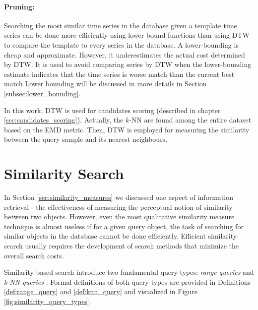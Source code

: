 \paragraph{Pruning:} Searching the most similar time series in the database given a template time series can be done more efficiently using lower bound functions than using DTW to compare the template to every series in the database. 
A lower-bounding is cheap and approximate. 
However, it underestimates the actual cost determined by DTW. 
It is used to avoid comparing series by DTW when the lower-bounding estimate indicates that the time series is worse match than the current best match \cite{rath2003word} 
Lower bounding will be discussed in more details in Section \ref{subsec:lower_bounding}.

\iftoggle{edit-mode}{\hspace{0pt}\marginpar{How DTW is used in this work?}}{}
In this work, DTW is used for candidates scoring (described in chapter \ref{sec:candidates_scoring}). 
Actually, the $k$-NN are found among the entire dataset based on the EMD metric. 
Then, DTW is employed for measuring the similarity between the query sample and its nearest neighbours.


\newpage{}

\section{Similarity Search}
\label{sec:similarity_search}
 
\iftoggle{edit-mode}{\hspace{0pt}\marginpar{Introduction}}{}
In Section \ref{sec:similarity_measures} we discussed one aspect of information retrieval - the effectiveness of measuring the perceptual notion of similarity between two objects.
However, even the most qualitative similarity measure technique is almost useless if for a given query object, the task of searching for similar objects in the database cannot be done efficiently.
Efficient similarity search usually requires the development of search methods that minimize the overall search costs.

\iftoggle{edit-mode}{\hspace{0pt}\marginpar{Similarity search query types}}{}
Similarity based search introduce two fundamental query types: \emph{range queries} and \emph{k-NN queries} \cite{hetland2009basic}. 
Formal definitions of both query types are provided in Definitions \ref{def:range_query} and \ref{def:knn_query} and visualized in Figure \ref{fig:similarity_query_types}.


